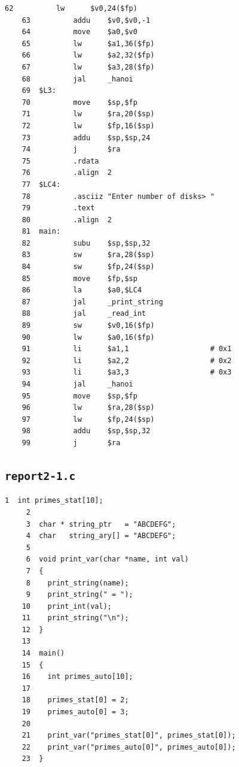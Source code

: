 \begin{Verbatim}[fontsize=\small, baselinestretch=0.8]
    62          lw      $v0,24($fp)
    63          addu    $v0,$v0,-1
    64          move    $a0,$v0
    65          lw      $a1,36($fp)
    66          lw      $a2,32($fp)
    67          lw      $a3,28($fp)
    68          jal     _hanoi
    69  $L3:
    70          move    $sp,$fp
    71          lw      $ra,20($sp)
    72          lw      $fp,16($sp)
    73          addu    $sp,$sp,24
    74          j       $ra
    75          .rdata
    76          .align  2
    77  $LC4:
    78          .asciiz "Enter number of disks> "
    79          .text
    80          .align  2
    81  main:
    82          subu    $sp,$sp,32
    83          sw      $ra,28($sp)
    84          sw      $fp,24($sp)
    85          move    $fp,$sp
    86          la      $a0,$LC4
    87          jal     _print_string
    88          jal     _read_int
    89          sw      $v0,16($fp)
    90          lw      $a0,16($fp)
    91          li      $a1,1                   # 0x1
    92          li      $a2,2                   # 0x2
    93          li      $a3,3                   # 0x3
    94          jal     _hanoi
    95          move    $sp,$fp
    96          lw      $ra,28($sp)
    97          lw      $fp,24($sp)
    98          addu    $sp,$sp,32
    99          j       $ra
\end{Verbatim}

\subsection{\texttt{report2-1.c}} \label{sec:report2-1.c}
\begin{Verbatim}[fontsize=\small, baselinestretch=0.8]
     1	int primes_stat[10];
     2	
     3	char * string_ptr   = "ABCDEFG";
     4	char   string_ary[] = "ABCDEFG";
     5	
     6	void print_var(char *name, int val)
     7	{
     8	  print_string(name);
     9	  print_string(" = ");
    10	  print_int(val);
    11	  print_string("\n");
    12	}
    13	
    14	main()
    15	{
    16	  int primes_auto[10];
    17	
    18	  primes_stat[0] = 2;
    19	  primes_auto[0] = 3;
    20	
    21	  print_var("primes_stat[0]", primes_stat[0]);
    22	  print_var("primes_auto[0]", primes_auto[0]);
    23	}
\end{Verbatim}


